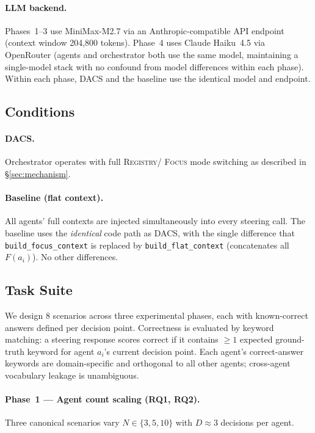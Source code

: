 \documentclass{article}
\begin{document}
\paragraph{LLM backend.}
Phases~1--3 use MiniMax-M2.7 via an Anthropic-compatible API endpoint
(context window 204{,}800 tokens).
Phase~4 uses Claude Haiku~4.5 via OpenRouter (agents and orchestrator both
use the same model, maintaining a single-model stack with no confound from
model differences within each phase).
Within each phase, DACS and the baseline use the identical model and endpoint.

\subsection{Conditions}
\label{sec:conditions}

\paragraph{DACS.} Orchestrator operates with full \textsc{Registry}/
\textsc{Focus} mode switching as described in \S\ref{sec:mechanism}.

\paragraph{Baseline (flat context).} All agents' full contexts are
injected simultaneously into every steering call.
The baseline uses the \emph{identical} code path as DACS, with the single
difference that \texttt{build\_focus\_context} is replaced by
\texttt{build\_flat\_context} (concatenates all $F(a_i)$).
No other differences.

\subsection{Task Suite}
\label{sec:tasks}

We design 8 scenarios across three experimental phases,
each with known-correct answers defined per decision point.
Correctness is evaluated by keyword matching: a steering response scores
correct if it contains $\geq 1$ expected ground-truth keyword for agent
$a_i$'s current decision point.
Each agent's correct-answer keywords are domain-specific and orthogonal
to all other agents; cross-agent vocabulary leakage is unambiguous.

\paragraph{Phase~1 — Agent count scaling (RQ1, RQ2).}
Three canonical scenarios vary $N \in \{3, 5, 10\}$ with $D \approx 3$
decisions per agent.
\end{document}
